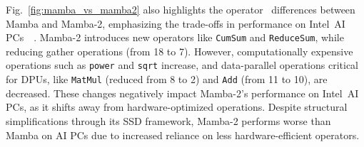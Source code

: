 Fig.~\ref{fig:mamba_vs_mamba2} also highlights the operator~\cite{openvino_ops} differences between Mamba and Mamba-2, emphasizing the trade-offs in performance on Intel\textregistered\ AI PCs~\cite{lnl}~\cite{mtl}. Mamba-2 introduces new operators like \texttt{CumSum} and \texttt{ReduceSum}, while reducing gather operations (from 18 to 7). However, computationally expensive operations such as \texttt{power} and \texttt{sqrt} increase, and data-parallel operations critical for DPUs, like \texttt{MatMul} (reduced from 8 to 2) and \texttt{Add} (from 11 to 10), are decreased. These changes negatively impact Mamba-2's performance on Intel\textregistered\ AI PCs, as it shifts away from hardware-optimized operations. Despite structural simplifications through its SSD framework, Mamba-2 performs worse than Mamba on AI PCs due to increased reliance on less hardware-efficient operators.



